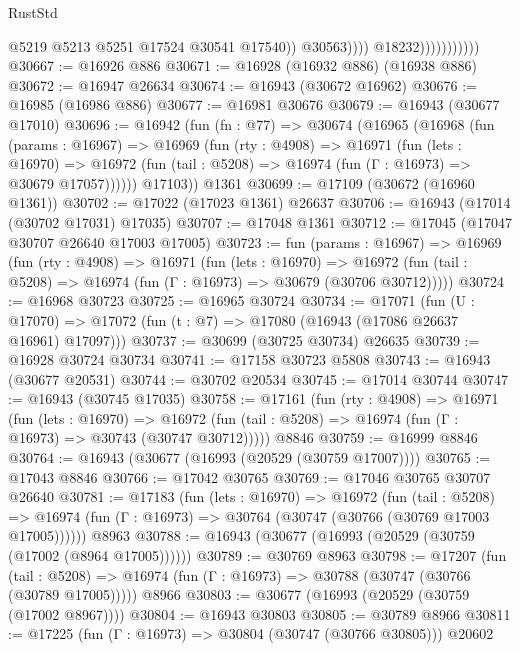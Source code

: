 \begin{lexlean}{RustStd}
\begin{coremodule}
                                      @5219
                                      @5213
                                      @5251
                                      @17524
                                      @30541
                                      @17540))
                                  @30563))))
                          @18232)))))))))))
@30667 := @16926 @886
@30671 := @16928 (@16932 @886) (@16938 @886)
@30672 := @16947 @26634
@30674 := @16943 (@30672 @16962)
@30676 := @16985 (@16986 @886)
@30677 := @16981 @30676
@30679 := @16943 (@30677 @17010)
@30696 := @16942
    (fun (fn : @77) =>
    @30674
      (@16965
        (@16968
          (fun (params : @16967) =>
          @16969
            (fun (rty : @4908) =>
            @16971
              (fun (lets : @16970) =>
              @16972 (fun (tail : @5208) => @16974 (fun (Γ : @16973) => @30679 @17057))))))
        @17103))
    @1361
@30699 := @17109 (@30672 (@16960 @1361))
@30702 := @17022 (@17023 @1361) @26637
@30706 := @16943 (@17014 (@30702 @17031) @17035)
@30707 := @17048 @1361
@30712 := @17045 (@17047 @30707 @26640 @17003 @17005)
@30723 := fun (params : @16967) =>
  @16969
    (fun (rty : @4908) =>
    @16971
      (fun (lets : @16970) =>
      @16972 (fun (tail : @5208) => @16974 (fun (Γ : @16973) => @30679 (@30706 @30712)))))
@30724 := @16968 @30723
@30725 := @16965 @30724
@30734 := @17071
    (fun (U : @17070) => @17072 (fun (t : @7) => @17080 (@16943 (@17086 @26637 @16961) @17097)))
@30737 := @30699 (@30725 @30734) @26635
@30739 := @16928 @30724 @30734
@30741 := @17158 @30723 @5808
@30743 := @16943 (@30677 @20531)
@30744 := @30702 @20534
@30745 := @17014 @30744
@30747 := @16943 (@30745 @17035)
@30758 := @17161
    (fun (rty : @4908) =>
    @16971
      (fun (lets : @16970) =>
      @16972 (fun (tail : @5208) => @16974 (fun (Γ : @16973) => @30743 (@30747 @30712)))))
    @8846
@30759 := @16999 @8846
@30764 := @16943 (@30677 (@16993 (@20529 (@30759 @17007))))
@30765 := @17043 @8846
@30766 := @17042 @30765
@30769 := @17046 @30765 @30707 @26640
@30781 := @17183
    (fun (lets : @16970) =>
    @16972
      (fun (tail : @5208) =>
      @16974 (fun (Γ : @16973) => @30764 (@30747 (@30766 (@30769 @17003 @17005))))))
    @8963
@30788 := @16943 (@30677 (@16993 (@20529 (@30759 (@17002 (@8964 @17005))))))
@30789 := @30769 @8963
@30798 := @17207
    (fun (tail : @5208) => @16974 (fun (Γ : @16973) => @30788 (@30747 (@30766 (@30789 @17005)))))
    @8966
@30803 := @30677 (@16993 (@20529 (@30759 (@17002 @8967))))
@30804 := @16943 @30803
@30805 := @30789 @8966
@30811 := @17225 (fun (Γ : @16973) => @30804 (@30747 (@30766 @30805))) @20602

\end{coremodule}
\end{lexlean}

